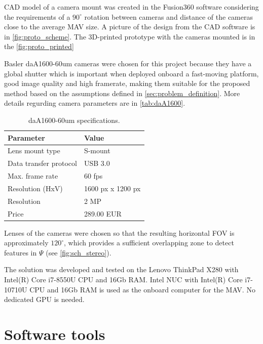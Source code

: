 CAD model of a camera mount was created in the Fusion360 software considering the requirements of a $90^\circ$ rotation between cameras and distance of the cameras close to the average MAV size.
A picture of the design from the CAD software is in \autoref{fig:proto_scheme}.
The 3D-printed prototype with the cameras mounted is in the \autoref{fig:proto_printed}

Basler daA1600-60um cameras were chosen for this project because they have a global shutter which is important when deployed onboard a fast-moving platform, good image quality and high framerate, making them suitable for the proposed method based on the assumptions defined in \autoref{sec:problem_definition}. 
More details regurding camera parameters are in \autoref{tab:daA1600}.

\begin{table}
    \caption{daA1600-60um specifications.}
    \label{tab:daA1600}
    \begin{center}
      \begin{tabular}{ l l }
      \hline
      Parameter              & Value             \\ \hline
      Lens mount type        & S-mount           \\
      Data transfer protocol & USB 3.0           \\
      Max. frame rate        & 60 fps            \\
      Resolution (HxV)       & 1600 px x 1200 px \\
      Resolution             & 2 MP              \\
      Price                  & 289.00 EUR        \\ \hline
      \end{tabular}
    \end{center}
\end{table}

Lenses of the cameras were chosen so that the resulting horizontal FOV is approximately $120^\circ$, which provides a sufficient overlapping zone to detect features in $\Psi$ (see \autoref{fig:sch_stereo}).

The solution was developed and tested on the Lenovo ThinkPad X280 with Intel(R) Core i7-8550U CPU and 16Gb RAM.
Intel NUC with Intel(R) Core i7-10710U CPU and 16Gb RAM is used as the onboard computer for the MAV.
No dedicated GPU is needed.

\section{Software tools}
\label{sec:impl_software}

